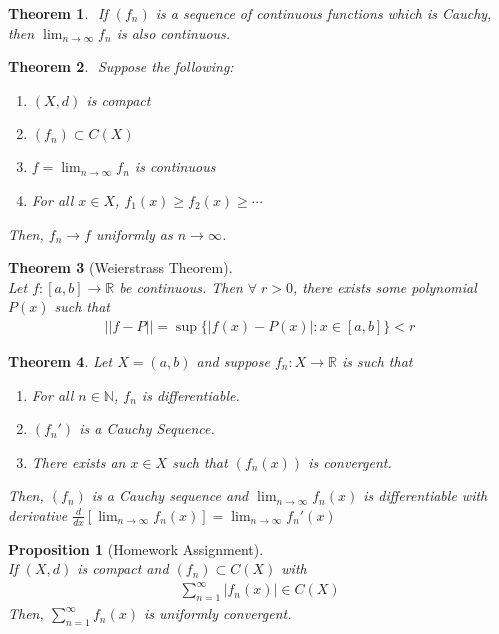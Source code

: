 \documentclass[10pt,a4paper]{article}
\newtheorem{theorem}{Theorem}
\newtheorem{proposition}{Proposition}
\theoremstyle{definition}
\theoremstyle{definition}
\numberwithin{equation}{section}
\numberwithin{theorem}{section}
\numberwithin{proposition}{section}
\numberwithin{lemma}{section}
\numberwithin{corollary}{section}
\begin{document}
\begin{theorem}$ $
If $(f_n)$ is a sequence of continuous functions which is Cauchy, then $\lim_{n \to \infty} f_n$ is also continuous. 
\end{theorem}

\begin{theorem}$ $
Suppose the following:
\begin{enumerate}
\item $(X, d)$ is compact
\item $(f_n) \subset C(X)$
\item $f = \lim_{n \to \infty} f_n$ is continuous
\item For all $x \in X$, $f_1(x) \geq f_2(x) \geq \cdots $
\end{enumerate}
Then, $f_n \to f$ uniformly as $n \to \infty$. 
\end{theorem}

\begin{theorem}[Weierstrass Theorem]$ $
\\Let $f: [a, b] \to \mathbb{R}$ be continuous. Then $\forall \; r > 0$, there exists some polynomial $P(x)$ such that 
\begin{align*}
||f - P|| = \sup\{|f(x) - P(x)| : x \in [a, b]\} < r
\end{align*}
\end{theorem}

\begin{theorem}
Let $X = (a, b)$ and suppose $f_n : X \to \mathbb{R}$ is such that 
\begin{enumerate}
\item For all $n \in \mathbb{N}$, $f_n$ is differentiable.
\item $(f_n')$ is a Cauchy Sequence.
\item There exists an $x \in X$ such that $(f_n(x))$ is convergent. 
\end{enumerate}
Then, $(f_n)$ is a Cauchy sequence and $\lim_{n \to \infty} f_n(x)$ is differentiable with derivative $\frac{d}{dx}[\lim_{n \to \infty} f_n(x)] = \lim_{n \to \infty} f_n'(x)$
\end{theorem}

\begin{proposition}[Homework Assignment]$ $
\\If $(X, d)$ is compact and $(f_n) \subset C(X)$ with 
\begin{align*}
\sum_{n = 1}^\infty |f_n(x)| \in C(X)
\end{align*}
Then, $\sum_{n = 1}^\infty f_n(x)$ is uniformly convergent. 
\end{proposition}
\end{document}
